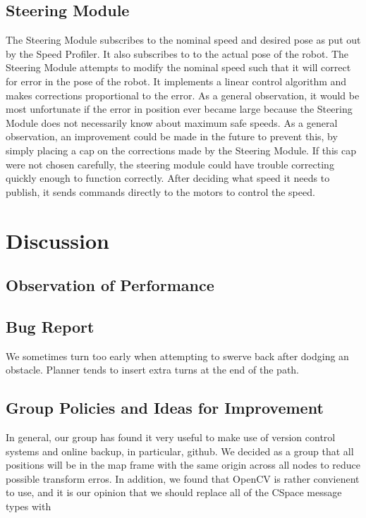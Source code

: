 \documentclass{article}
\begin{document}
\subsection{Steering Module}

The Steering Module subscribes to the nominal speed and desired pose as put out by the Speed Profiler.  It also subscribes to to the actual pose of the robot.  The Steering Module attempts to modify the nominal speed such that it will correct for error in the pose of the robot.  It implements a linear control algorithm and makes corrections proportional to the error.  As a general observation, it would be most unfortunate if the error in position ever became large because the Steering Module does not necessarily know about maximum safe speeds.  As a general observation, an improvement could be made in the future to prevent this, by simply placing a cap on the corrections made by the Steering Module.  If this cap were not chosen carefully, the steering module could have trouble correcting quickly enough to function correctly.  After deciding what speed it needs to publish, it sends commands directly to the motors to control the speed.

\section{Discussion}
\subsection{Observation of Performance}
\subsection{Bug Report}

We sometimes turn too early when attempting to swerve back after dodging an obstacle.
Planner tends to insert extra turns at the end of the path.

\subsection{Group Policies and Ideas for Improvement}

In general, our group has found it very useful to make use of version control systems and online backup, in particular, github.
We decided as a group that all positions will be in the map frame with the same origin across all nodes to reduce possible transform erros.
In addition, we found that OpenCV is rather convienent to use, and it is our opinion that we should replace all of the CSpace message types with 
\end{document}
